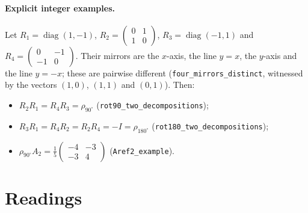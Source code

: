 \documentclass[11pt]{article}
\theoremstyle{definition}
\theoremstyle{remark}
\begin{document}
\paragraph{Explicit integer examples.} Let $R_1=\operatorname{diag}(1,-1)$,
$R_2=\left(\begin{smallmatrix}0&1\\ 1&0\end{smallmatrix}\right)$,
$R_3=\operatorname{diag}(-1,1)$ and $R_4=\left(\begin{smallmatrix}0&-1\\
-1&0\end{smallmatrix}\right)$. Their mirrors are the $x$-axis, the line $y=x$, the $y$-axis and
the line $y=-x$; these are pairwise different (\texttt{four\_mirrors\_distinct}, witnessed by the
vectors $(1,0)$, $(1,1)$ and $(0,1)$). Then:
\begin{itemize}
\item $R_2R_1=R_4R_3=\rho_{90^\circ}$ (\texttt{rot90\_two\_decompositions});
\item $R_3R_1=R_4R_2=R_2R_4=-I=\rho_{180^\circ}$ (\texttt{rot180\_two\_decompositions});
\item $\rho_{90^\circ}A_2=\frac15\left(\begin{smallmatrix}-4&-3\\ -3&4\end{smallmatrix}\right)$
(\texttt{Aref2\_example}).
\end{itemize}

\section{Readings}\label{sec:readings}
\end{document}

